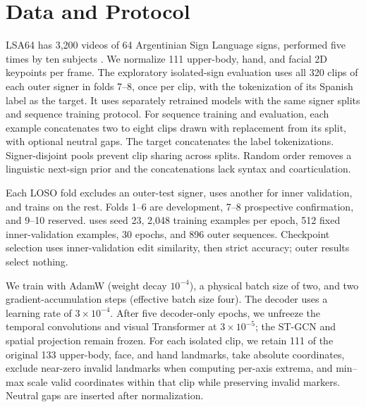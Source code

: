 \section{Data and Protocol}

LSA64 has 3,200 videos of 64 Argentinian Sign Language signs, performed five times
by ten subjects \citep{ronchetti2016lsa64}.  We normalize 111 upper-body, hand,
and facial 2D keypoints per frame.  The exploratory isolated-sign evaluation
uses all 320 clips of each outer signer in folds 7--8, once per clip, with the
\Gemma{} tokenization of its Spanish label as the target.  It uses separately
retrained \ImitatorEOne{} models with the same signer splits and sequence
training protocol.  For sequence training and evaluation, each example
concatenates two to eight clips drawn with replacement from its split, with
optional neutral gaps.  The target concatenates the label tokenizations.
Signer-disjoint pools prevent clip sharing across splits.  Random order removes
a linguistic next-sign prior and the concatenations lack syntax and coarticulation.

Each LOSO fold excludes an outer-test signer, uses another for inner validation,
and trains on the rest.  Folds 1--6 are development, 7--8 prospective confirmation,
and 9--10 reserved.  \ImitatorEOne{} uses seed 23, 2,048 training examples per
epoch, 512 fixed inner-validation examples, 30 epochs, and 896 outer sequences.
Checkpoint selection uses inner-validation edit similarity, then strict accuracy;
outer results select nothing.

We train with AdamW (weight decay $10^{-4}$), a physical batch size of two, and
two gradient-accumulation steps (effective batch size four).  The decoder uses a
learning rate of $3\times10^{-4}$.  After five decoder-only epochs, we unfreeze
the temporal convolutions and visual Transformer at $3\times10^{-5}$; the ST-GCN
and spatial projection remain frozen.  For each isolated clip, we retain 111 of
the original 133 upper-body, face, and hand landmarks, take absolute coordinates,
exclude near-zero invalid landmarks when computing per-axis extrema, and min--max
scale valid coordinates within that clip while preserving invalid markers.
Neutral gaps are inserted after normalization.

